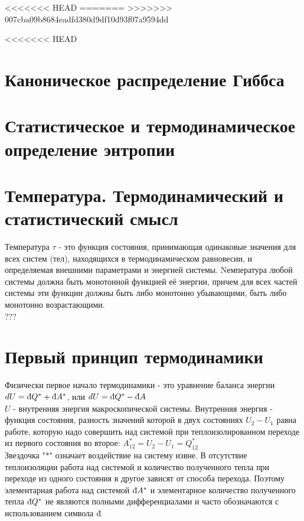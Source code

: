 <<<<<<< HEAD
\newcommand{\colontitulAutors}{astronom\_v\_cube}
\newcommand{\colontitulYear}{2023}
\newcommand{\colontitulEducationalSubject}{Программа-минимум по термодинамике}
\newcommand{\colontitulTeacher}{В. Г. Гавриленко}
=======
\newcommand{\colontitulAutors}{edombek}
\newcommand{\colontitulYear}{2022}
\newcommand{\colontitulEducationalSubject}{Термодинамика и статистическая физика}
\newcommand{\colontitulTeacher}{Гавриленко В.Г.}
>>>>>>> 007cba09b8684eadfd380d9df10d93f07a9594dd




	\small
	\begin{multicols*}{2}
<<<<<<< HEAD

		\section{Каноническое распределение Гиббса}


		\section{Статистическое и термодинамическое определение энтропии}

		\section{Температура. Термодинамический и статистический смысл}
		Температура $\tau$ - это функция состояния, принимающая одинаковые значения для всех систем (тел), находящихся в термодинамическом равновесии, и определяемая внешними параметрами и энергией системы. Nемпература любой системы должна быть монотонной функцией её энергии, причем для всех частей системы эти функции должны быть либо монотонно убывающими, быть либо монотонно возрастающими.\\
		???

		\section{Первый принцип термодинамики}
		Физически первое начало термодинамики - это уравнение баланса энергии\\
		$dU = \text{\dj}Q^* + \text{\dj}A^*$, или $dU = \text{\dj}Q^* - \text{\dj}A$\\
		$U$ - внутренняя энергия макроскопической системы. Внутренняя энергия - функция состояния, разность значений которой в двух состояниях $U_2 - U_1$ равна работе, которую надо совершить над системой при теплоизолированном переходе из первого состояния во второе: $A^*_{12} = U_2 - U_1 = Q^*_{12}$\\
		Звездочка "$*$" означает воздействие на систему извне. В отсутствие теплоизоляции работа над системой и количество полученного тепла при переходе из одного состояния в другое зависят от способа перехода. Поэтому элементарная работа над системой $\text{\dj}A^*$ и элементарное количество полученного тепла $\text{\dj}Q^*$ не являются полными дифференциалами и часто обозначаются с использованием символа $\text{\dj}$


\end{multicols*}

